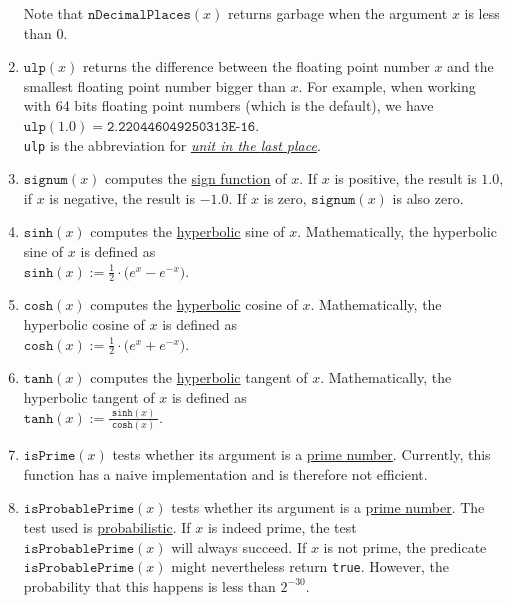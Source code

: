 \begin{enumerate}
      Note that $\texttt{nDecimalPlaces}(x)$ returns garbage when the argument $x$ is less than $0$.
\item $\mathtt{ulp}(x)$  returns the difference between the floating point number $x$ and
      the smallest floating point number bigger than $x$.  For example, when working with
      64 bits floating point numbers (which is the default), we have
      \\[0.2cm]
      \hspace*{1.3cm}
      $\mathtt{ulp}(1.0) = \texttt{2.220446049250313E-16}$.
      \\[0.2cm]
      \texttt{ulp} is the abbreviation for 
      \href{https://en.wikipedia.org/wiki/Unit_in_the_last_place}{\emph{\underline{u}nit in the \underline{l}ast \underline{p}lace}}. 
\item $\mathtt{signum}(x)$ computes the 
      \href{https://en.wikipedia.org/wiki/Sign_function}{sign function} of $x$.  If $x$ is positive,
      the result is $1.0$, if $x$ is negative, the result is $-1.0$.  If $x$ is zero,
      $\mathtt{signum}(x)$ is also zero.
\item $\texttt{sinh}(x)$ computes the
      \href{https://en.wikipedia.org/wiki/Hyperbolic_function}{hyperbolic} sine of $x$.  
      Mathematically, the hyperbolic sine of $x$ is defined as 
      \\[0.2cm]
      \hspace*{1.3cm}
      $\mathtt{sinh}(x) := \frac{1}{2} \cdot \bigl(e^x - e^{-x}\bigr)$.
\item $\texttt{cosh}(x)$ computes the
      \href{https://en.wikipedia.org/wiki/Hyperbolic_function}{hyperbolic} cosine of $x$.
      Mathematically, the hyperbolic cosine of $x$ is defined as 
      \\[0.2cm]
      \hspace*{1.3cm}
      $\mathtt{cosh}(x) := \frac{1}{2} \cdot \bigl(e^x + e^{-x}\bigr)$.
\item $\texttt{tanh}(x)$ computes the
      \href{https://en.wikipedia.org/wiki/Hyperbolic_function}{hyperbolic} tangent of $x$.  
      Mathematically, the hyperbolic tangent of $x$ is defined as 
      \\[0.2cm]
      \hspace*{1.3cm}
      $\mathtt{tanh}(x) := \displaystyle \frac{\;\mathtt{sinh}(x)\;}{\mathtt{cosh}(x)}$.
\item $\texttt{isPrime}(x)$ tests whether its argument is a 
      \href{https://en.wikipedia.org/wiki/Prime_number}{prime number}.  Currently, 
      this function has a naive implementation and is therefore not efficient.
\item $\texttt{isProbablePrime}(x)$ tests whether its argument is a
      \href{https://en.wikipedia.org/wiki/Prime_number}{prime number}.  The test 
      used is 
      \href{https://en.wikipedia.org/wiki/Miller-Rabin-primality_test}{probabilistic}.  If
      $x$ is indeed  prime, the test $\texttt{isProbablePrime}(x)$ 
      will always succeed.  If $x$ is not prime, the predicate $\texttt{isProbablePrime}(x)$
      might nevertheless return \texttt{true}.  However, the probability that this happens
      is less than $2^{-30}$.


\end{enumerate}
